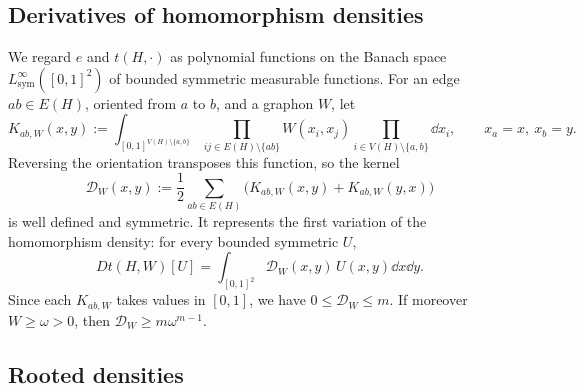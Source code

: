 \subsection{Derivatives of homomorphism densities}\label{sec:derivatives}

We regard $e$ and $t(H,\cdot)$ as polynomial functions on the Banach space
$L^\infty_{\mathrm{sym}}([0,1]^2)$ of bounded symmetric measurable functions.
For an edge $ab\in E(H)$, oriented from $a$ to $b$, and a graphon $W$, let
\[
  K_{ab,W}(x,y):=\int_{[0,1]^{V(H)\setminus\{a,b\}}}
  \prod_{ij\in E(H)\setminus\{ab\}}W(x_i,x_j)
  \prod_{i\in V(H)\setminus\{a,b\}}\dd x_i,
  \qquad x_a=x,\ x_b=y.
\]
Reversing the orientation transposes this function, so the kernel
\begin{equation}\label{eq:derivative-kernel}
  \mathcal D_W(x,y):=\frac12\sum_{ab\in E(H)}\bigl(K_{ab,W}(x,y)+K_{ab,W}(y,x)\bigr)
\end{equation}
is well defined and symmetric.  It represents the first variation of the
homomorphism density: for every bounded symmetric $U$,
\begin{equation}\label{eq:first-variation}
  Dt(H,W)[U]=\int_{[0,1]^2}\mathcal D_W(x,y)\,U(x,y)\dd x\dd y.
\end{equation}
Since each $K_{ab,W}$ takes values in $[0,1]$, we have $0\le\mathcal D_W\le m$.
If moreover $W\ge\omega>0$, then $\mathcal D_W\ge m\omega^{m-1}$.

\subsection{Rooted densities}\label{sec:rooted-densities}


